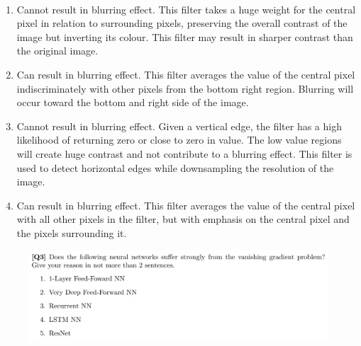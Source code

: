 \documentclass[12pt]{article}
\newenvironment{solution}[2][Solution]{\begin{trivlist}
\item[\hskip \labelsep {\bfseries #1}]}{\end{trivlist}}
\begin{document}
\pagebreak
\begin{solution}{}~
\begin{enumerate}
\item Cannot result in blurring effect. This filter takes a huge weight for the central pixel in relation to surrounding pixels, preserving the overall contrast of the image but inverting its colour. This filter may result in sharper contrast than the original image.
\item Can result in blurring effect. This filter averages the value of the central pixel indiscriminately with other pixels from the bottom right region. Blurring will occur toward the bottom and right side of the image.
\item Cannot result in blurring effect. Given a vertical edge, the filter has a high likelihood of returning zero or close to zero in value. The low value regions will create huge contrast and not contribute to a blurring effect. This filter is used to detect horizontal edges while downsampling the resolution of the image.
\item Can result in blurring effect. This filter averages the value of the central pixel with all other pixels in the filter, but with emphasis on the central pixel and the pixels surrounding it. 
\end{enumerate}
\end{solution}


\begin{figure}[h!]
\includegraphics[width=\linewidth]{./assets/201806300417.png}
\end{figure}
\end{document}
